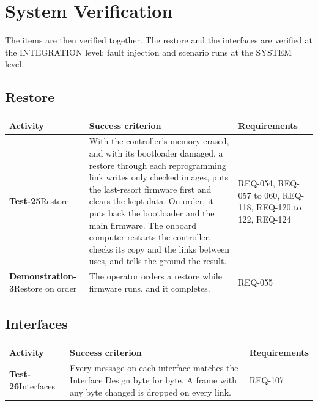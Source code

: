 \documentclass[11pt,a4paper]{article}
\begin{document}
\section{System Verification}
The items are then verified together. The restore and the interfaces are
verified at the INTEGRATION level; fault injection and scenario runs at the
SYSTEM level.

\subsection{Restore}
{\footnotesize
\begin{xltabular}{\textwidth}{@{}>{\raggedright\arraybackslash}p{3.0cm}>{\raggedright\arraybackslash}X>{\raggedright\arraybackslash}p{2.4cm}@{}}
\toprule
Activity & Success criterion & Requirements \\
\midrule
\endhead
\textbf{Test-25}\newline Restore & With the controller's memory erased, and with its bootloader damaged, a restore through each reprogramming link writes only checked images, puts the last-resort firmware first and clears the kept data. On order, it puts back the bootloader and the main firmware. The onboard computer restarts the controller, checks its copy and the links between uses, and tells the ground the result. & REQ-054, REQ-057 to 060, REQ-118, REQ-120 to 122, REQ-124 \\
\textbf{Demonstration-3}\newline Restore on order & The operator orders a restore while firmware runs, and it completes. & REQ-055 \\
\bottomrule
\end{xltabular}}
\addtocounter{table}{-1}

\subsection{Interfaces}
{\footnotesize
\begin{xltabular}{\textwidth}{@{}>{\raggedright\arraybackslash}p{3.0cm}>{\raggedright\arraybackslash}X>{\raggedright\arraybackslash}p{2.4cm}@{}}
\toprule
Activity & Success criterion & Requirements \\
\midrule
\endhead
\textbf{Test-26}\newline Interfaces & Every message on each interface matches the Interface Design byte for byte. A frame with any byte changed is dropped on every link. & REQ-107 \\
\bottomrule
\end{xltabular}}
\addtocounter{table}{-1}
\end{document}
